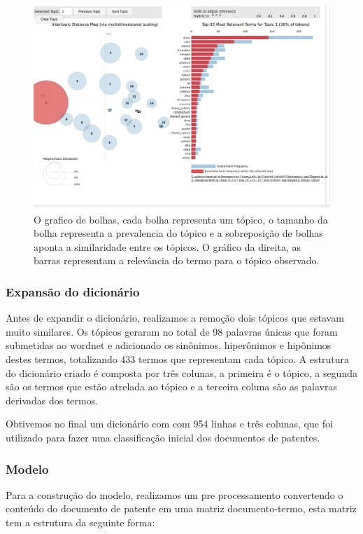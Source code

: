 \begin{figure}[ht!]
	\centering
	\includegraphics[scale=0.4]{imagens/construcao_dicionario1.png}
	\caption{O grafico de bolhas, cada bolha representa um tópico, o tamanho da bolha representa a prevalencia do tópico e a sobreposição de bolhas aponta a similaridade entre os tópicos. O gráfico da direita, as barras representam a relevância do termo para o tópico observado.
			 \label{pyLDAvis_image}}
\end{figure}

\subsubsection{Expansão do dicionário}

Antes de expandir o dicionário, realizamos a remoção dois tópicos que estavam muito similares. Os tópicos geraram no total de 98 palavras únicas que foram submetidas ao wordnet e adicionado os sinônimos, hiperônimos e hipônimos destes termos, totalizando 433 termos que representam cada tópico. A estrutura do dicionário criado é composta por três colunas, a primeira é o tópico, a segunda são os termos que estão atrelada ao tópico e a terceira coluna são as palavras derivadas dos termos.

	Obtivemos no final um dicionário com com 954 linhas e três colunas, que foi utilizado para fazer uma classificação inicial dos documentos de patentes.
	
\subsubsection{Modelo}

Para a construção do modelo, realizamos um pre processamento convertendo o conteúdo do documento de patente em uma matriz documento-termo, esta matriz tem a estrutura da seguinte forma:

